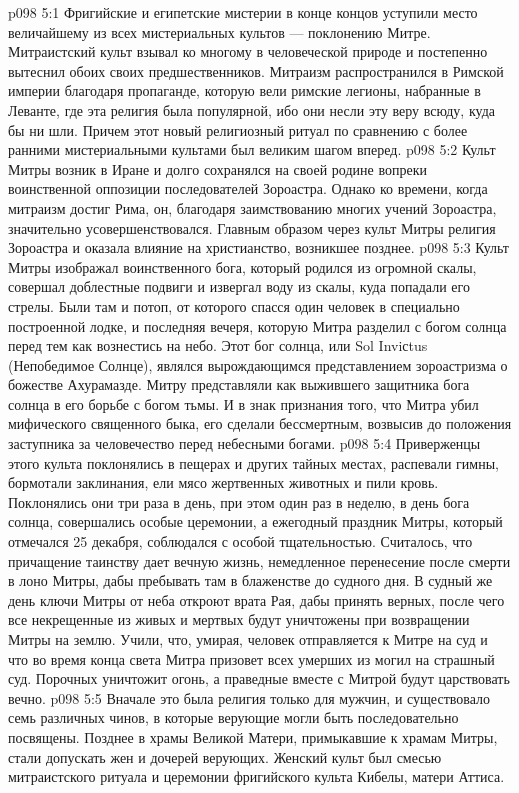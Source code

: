\vs p098 5:1 Фригийские и египетские мистерии в конце концов уступили место величайшему из всех мистериальных культов --- поклонению Митре. Митраистский культ взывал ко многому в человеческой природе и постепенно вытеснил обоих своих предшественников. Митраизм распространился в Римской империи благодаря пропаганде, которую вели римские легионы, набранные в Леванте, где эта религия была популярной, ибо они несли эту веру всюду, куда бы ни шли. Причем этот новый религиозный ритуал по сравнению с более ранними мистериальными культами был великим шагом вперед.
\vs p098 5:2 Культ Митры возник в Иране и долго сохранялся на своей родине вопреки воинственной оппозиции последователей Зороастра. Однако ко времени, когда митраизм достиг Рима, он, благодаря заимствованию многих учений Зороастра, значительно усовершенствовался. Главным образом через культ Митры религия Зороастра и оказала влияние на христианство, возникшее позднее.
\vs p098 5:3 \pc Культ Митры изображал воинственного бога, который родился из огромной скалы, совершал доблестные подвиги и извергал воду из скалы, куда попадали его стрелы. Были там и потоп, от которого спасся один человек в специально построенной лодке, и последняя вечеря, которую Митра разделил с богом солнца перед тем как вознестись на небо. Этот бог солнца, или Sol Inviсtus (Непобедимое Солнце), являлся вырождающимся представлением зороастризма о божестве Ахурамазде. Митру представляли как выжившего защитника бога солнца в его борьбе с богом тьмы. И в знак признания того, что Митра убил мифического священного быка, его сделали бессмертным, возвысив до положения заступника за человечество перед небесными богами.
\vs p098 5:4 Приверженцы этого культа поклонялись в пещерах и других тайных местах, распевали гимны, бормотали заклинания, ели мясо жертвенных животных и пили кровь. Поклонялись они три раза в день, при этом один раз в неделю, в день бога солнца, совершались особые церемонии, а ежегодный праздник Митры, который отмечался 25 декабря, соблюдался с особой тщательностью. Считалось, что причащение таинству дает вечную жизнь, немедленное перенесение после смерти в лоно Митры, дабы пребывать там в блаженстве до судного дня. В судный же день ключи Митры от неба откроют врата Рая, дабы принять верных, после чего все некрещенные из живых и мертвых будут уничтожены при возвращении Митры на землю. Учили, что, умирая, человек отправляется к Митре на суд и что во время конца света Митра призовет всех умерших из могил на страшный суд. Порочных уничтожит огонь, а праведные вместе с Митрой будут царствовать вечно.
\vs p098 5:5 Вначале это была религия только для мужчин, и существовало семь различных чинов, в которые верующие могли быть последовательно посвящены. Позднее в храмы Великой Матери, примыкавшие к храмам Митры, стали допускать жен и дочерей верующих. Женский культ был смесью митраистского ритуала и церемонии фригийского культа Кибелы, матери Аттиса.
